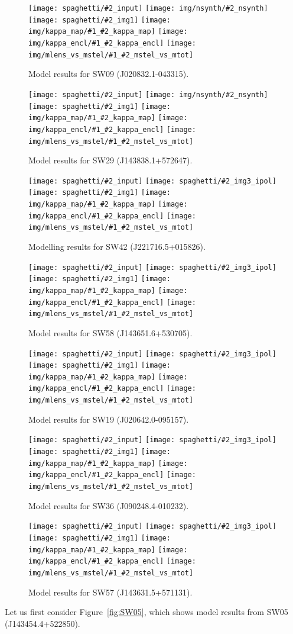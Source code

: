 \documentclass[fleqn,usenatbib]{mnras}
\newcommand{\inclfig}[2]{
  \centering
	\texttt{[image: spaghetti/\#2\_input]}%
	\texttt{[image: spaghetti/\#2\_img3\_ipol]}
	\texttt{[image: spaghetti/\#2\_img1]}%
        \texttt{[image: img/kappa\_map/\#1\_\#2\_kappa\_map]}
	\texttt{[image: img/kappa\_encl/\#1\_\#2\_kappa\_encl]}%
	\texttt{[image: img/mlens\_vs\_mstel/\#1\_\#2\_mstel\_vs\_mtot]}
}
\newcommand{\inclfign}[2]{
  \centering
	\texttt{[image: spaghetti/\#2\_input]}%
	\texttt{[image: img/nsynth/\#2\_nsynth]}
	\texttt{[image: spaghetti/\#2\_img1]}%
        \texttt{[image: img/kappa\_map/\#1\_\#2\_kappa\_map]}
	\texttt{[image: img/kappa\_encl/\#1\_\#2\_kappa\_encl]}%
	\texttt{[image: img/mlens\_vs\_mstel/\#1\_\#2\_mstel\_vs\_mtot]}
}
\newcommand{\figref}[1]{\ref{fig:#1}}
\begin{document}
\begin{figure}
  \inclfign{SW09}{ASW0002asp_5EKMWWVJHL}
  \caption{Model results for SW09 (J020832.1-043315).}
  \label{fig:SW09}
\end{figure}

\begin{figure}
  \inclfign{SW29}{ASW0008qsm_TOFS7JNGEK}
  \caption{Model results for SW29 (J143838.1+572647).}
  \label{fig:SW29}
\end{figure}

\begin{figure}
  \inclfig{SW42}{ASW00096rm_4Q3YCEWGLN}
  \caption{Modelling results for SW42 (J221716.5+015826).}
  \label{fig:SW42}
\end{figure}

\begin{figure}
  \inclfig{SW58}{ASW0007iwp_4XBJWT3COV}
  \caption{Model results for SW58 (J143651.6+530705).}
  \label{fig:SW58}
\end{figure}

\begin{figure}
  \inclfig{SW19}{ASW0001ld7_OS3CYAKLRT}
  \caption{Model results for SW19 (J020642.0-095157).}
  \label{fig:SW19}
\end{figure}


\begin{figure}
  \inclfig{SW36}{ASW000096t_7IPP7LWVOF}
  \caption{Model results for SW36 (J090248.4-010232).}
  \label{fig:SW36}
\end{figure}

\begin{figure}
  \inclfig{SW57}{ASW0008pag_5SXGXQYY6V}
  \caption{Model results for SW57 (J143631.5+571131).}
  \label{fig:SW57}
\end{figure}

Let us first consider Figure~\figref{SW05}, which shows model results
from SW05 (J143454.4+522850).
\end{document}

